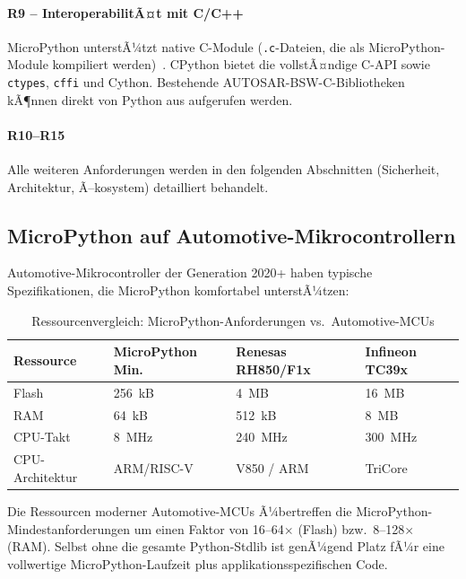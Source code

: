 ﻿\documentclass[12pt,a4paper,twoside]{article}
\begin{document}
\paragraph{R9 -- InteroperabilitÃ¤t mit C/C++}
MicroPython unterstÃ¼tzt native C-Module (\texttt{.c}-Dateien, die als
MicroPython-Module kompiliert werden)~\cite{micropython_cmodules2023}.
CPython bietet die vollstÃ¤ndige C-API sowie \texttt{ctypes},
\texttt{cffi} und Cython. Bestehende AUTOSAR-BSW-C-Bibliotheken
kÃ¶nnen direkt von Python aus aufgerufen werden.

\paragraph{R10--R15}
Alle weiteren Anforderungen werden in den folgenden Abschnitten
(Sicherheit, Architektur, Ã–kosystem) detailliert behandelt.

\subsection{MicroPython auf Automotive-Mikrocontrollern}
\label{subsec:automotive_mcu}

Automotive-Mikrocontroller der Generation 2020+ haben typische Spezifikationen,
die MicroPython komfortabel unterstÃ¼tzen:

\begin{table}[h]
\centering
\caption{Ressourcenvergleich: MicroPython-Anforderungen vs.\ Automotive-MCUs}
\label{tab:mcu_resources}
\begin{tabular}{llll}
\toprule
\textbf{Ressource} & \textbf{MicroPython Min.} & \textbf{Renesas RH850/F1x} & \textbf{Infineon TC39x} \\
\midrule
Flash             & 256~kB           & 4~MB             & 16~MB \\
RAM               & 64~kB            & 512~kB           & 8~MB \\
CPU-Takt          & 8~MHz            & 240~MHz          & 300~MHz \\
CPU-Architektur   & ARM/RISC-V       & V850 / ARM       & TriCore \\
\bottomrule
\end{tabular}
\end{table}

Die Ressourcen moderner Automotive-MCUs Ã¼bertreffen die MicroPython-Mindestanfor\-derungen
um einen Faktor von 16--64$\times$ (Flash) bzw.\ 8--128$\times$ (RAM).
Selbst ohne die gesamte Python-Stdlib ist genÃ¼gend Platz fÃ¼r
eine vollwertige MicroPython-Laufzeit plus applikationsspezifischen Code.
\end{document}
